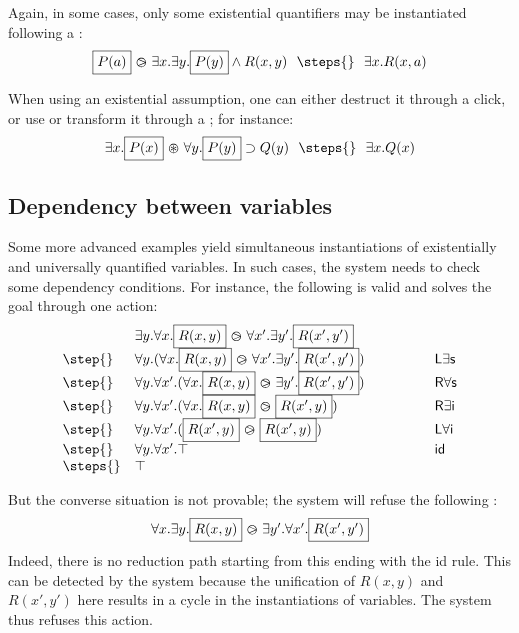 Again, in some cases, only some existential quantifiers may be
instantiated following a :
$$
\begin{array}{rcl}
\select{P(a)}\back \exists x.\exists y. \select{P(y)}\land R(x,y)
 ~\/~\steps{}
~\/~
    \exists x. R(x,a)
\end{array}
$$

When using an existential assumption, one can either destruct it
through a click, or use or transform it through a ; for instance:
$$
\exists x.\select{P(x)}\forw \forall y.\select{P(y)}\limp
Q(y)  ~\/~\steps{}
~\/~\exists x.Q(x)
$$

\subsection{Dependency between variables}
Some more advanced examples yield simultaneous instantiations of
existentially and universally quantified variables. In such cases, the
system needs to check some dependency conditions. For instance, the
following  is valid and solves the goal through one action:
$$
\begin{array}{lll}
  &\exists y. \forall x. \select{R(x,y)}\back \forall x'.\exists
    y'. \select{R(x',y')}& \\
  \step{}& \forall y.(\forall x. \select{R(x,y)}\back \forall x'.\exists
        y'. \select{R(x',y')} ) \mbox{\hbox to 12pt{\hfill}}& \mathsf{L}\exists\mathsf{s}\\
  \step{} &\forall y. \forall x'. (\forall x. \select{R(x,y)}\back \exists
  y'. \select{R(x',y')} ) ~~~~~~~~~~~~&\mathsf{R}\forall\mathsf{s}\\
  \step{} &  \forall y. \forall x'. (\forall
         x. \select{R(x,y)}\back\select{R(x',y)} )&\mathsf{R}\exists\mathsf{i}\\
  \step{}&   \forall y. \forall
           x'. (\select{R(x',y)}\back\select{R(x',y)} )&\mathsf{L}\forall\mathsf{i}\\
   \step{}  &  \forall y. \forall
           x'. \top & \mathsf{id}\\
\steps{}& \top
\end{array}
$$

But the converse situation is not provable; the system will refuse
the following :
$$
\begin{array}{rcl}
  \forall x. \exists y. \fbox{$R(x,y)$}\operatorname{\,\varogreaterthan\,} \exists y'.\forall x'. \fbox{$R(x',y')$}
\end{array}
$$
Indeed, there is no reduction path starting from this  ending with the
\textsf{id} rule. This can be detected by the system because the unification of
$R(x,y)$ and $R(x',y')$ here results in a cycle in the instantiations of
variables. The system thus refuses this action.

